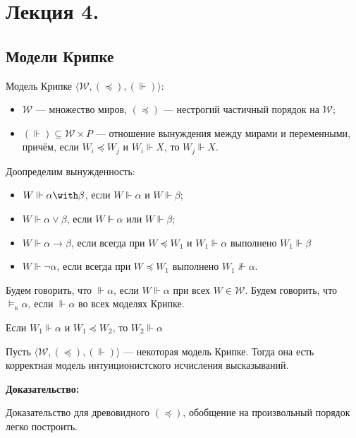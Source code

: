
\section{Лекция 4.}

\subsection{Модели Крипке}

 Модель Крипке $\langle \mathcal{W}, (\preceq), (\Vdash)\rangle$:
\begin{itemize}
\item $\mathcal{W}$ --- множество миров, $(\preceq)$ --- нестрогий частичный порядок на $\mathcal{W}$;
\item $(\Vdash)\subseteq \mathcal{W}\times P$ --- отношение вынуждения
между мирами и переменными, причём, если $W_i \preceq W_j$ и $W_i \Vdash X$, то $W_j \Vdash X$.
\end{itemize}

Доопределим вынужденность:
\begin{itemize}
\item $W \Vdash \alpha\with\beta$, если $W \Vdash \alpha$ и $W \Vdash \beta$;
\item $W \Vdash \alpha\vee\beta$, если $W \Vdash \alpha$ или $W \Vdash \beta$;
\item $W \Vdash \alpha\rightarrow\beta$, если всегда при $W \preceq W_1$ и $W_1 \Vdash \alpha$ выполнено $W_1 \Vdash \beta$
\item $W \Vdash \neg\alpha$, если всегда при $W \preceq W_1$ выполнено $W_1 \not\Vdash \alpha$.
\end{itemize}

Будем говорить, что $\Vdash\alpha$, если $W\Vdash\alpha$ при всех $W \in \mathcal{W}$.
Будем говорить, что $\models_\kappa\alpha$, если $\Vdash\alpha$ во всех моделях Крипке.


 Если $W_1 \Vdash \alpha$ и $W_1 \preceq W_2$, то $W_2 \Vdash \alpha$


Пусть $\langle \mathcal{W}, (\preceq), (\Vdash)\rangle$ ---
некоторая модель Крипке.
Тогда она есть корректная модель интуиционистского исчисления высказываний.

\textbf{Доказательство:}

Доказательство для древовидного $(\preceq)$, обобщение на произвольный порядок легко построить.

